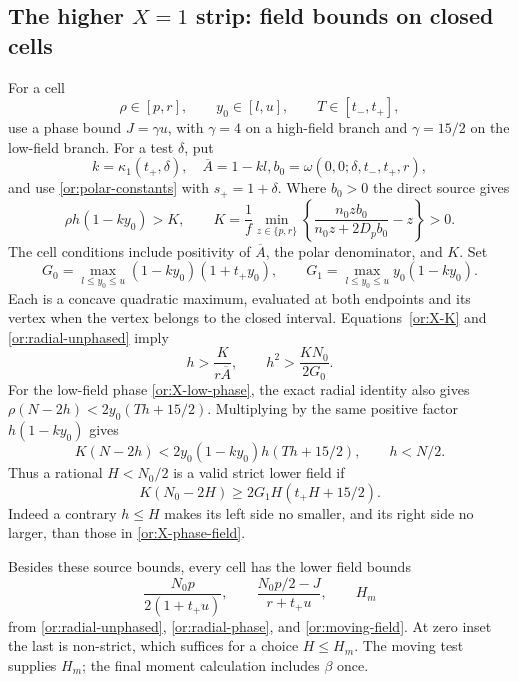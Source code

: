 \documentclass[11pt,reqno]{amsart}
\numberwithin{equation}{section}
\theoremstyle{definition}
\theoremstyle{remark}
\begin{document}
\subsection{The higher $X=1$ strip: field bounds on closed cells}

For a cell
\begin{equation}\label{or:X-cell}
       \rho\in[p,r],\qquad y_0\in[l,u],\qquad T\in[t_-,t_+],
\end{equation}
use a phase bound $J=\gamma u$, with $\gamma=4$ on a
high-field branch and $\gamma=15/2$ on the low-field branch.
For a test $\delta$, put
\[
 k=\kappa_1(t_+,\delta),\quad \overline A=1-kl,
 b_0=\omega(0,0;\delta,t_-,t_+,r),
\]
and use \eqref{or:polar-constants} with $s_+=1+\delta$.
Where $b_0>0$ the direct source gives
\begin{equation}\label{or:X-K}
 \rho h(1-ky_0)>K,\qquad
 K=\frac1f\min_{z\in\{p,r\}}
          \left\{\frac{n_0z b_0}{n_0z+2D_pb_0}-z\right\}>0.
\end{equation}
The cell conditions include positivity of $\overline A$, the polar
denominator, and $K$.  Set
\[
 G_0=\max_{l\le y_0\le u}(1-ky_0)(1+t_+y_0),\qquad
 G_1=\max_{l\le y_0\le u}y_0(1-ky_0).
\]
Each is a concave quadratic maximum, evaluated at both endpoints
and its vertex when the vertex belongs to the closed interval.
Equations~\eqref{or:X-K} and \eqref{or:radial-unphased} imply
\begin{equation}\label{or:X-source-fields}
             h>\frac{K}{r\overline A},\qquad
             h^2>\frac{KN_0}{2G_0}.
\end{equation}
For the low-field phase \eqref{or:X-low-phase}, the exact radial
identity also gives
$\rho(N-2h)<2y_0(Th+15/2)$.
Multiplying by the same positive factor $h(1-ky_0)$ gives
\[
          K(N-2h)<2y_0(1-ky_0)h(Th+15/2),\qquad h<N/2.
\]
Thus a rational $H<N_0/2$ is a valid strict lower field if
\begin{equation}\label{or:X-phase-field}
                   K(N_0-2H)\ge2G_1H(t_+H+15/2).
\end{equation}
Indeed a contrary $h\le H$ makes its left side no smaller, and its
right side no larger, than those in \eqref{or:X-phase-field}.

Besides these source bounds, every cell has the lower field bounds
\begin{equation}\label{or:X-radial-fields}
 \frac{N_0p}{2(1+t_+u)},\qquad
 \frac{N_0p/2-J}{r+t_+u},\qquad H_m
\end{equation}
from \eqref{or:radial-unphased}, \eqref{or:radial-phase}, and
\eqref{or:moving-field}.  At zero inset the last is non-strict,
which suffices for a choice $H\le H_m$.  The moving test supplies
$H_m$; the final moment calculation includes $\beta$ once.
\end{document}
